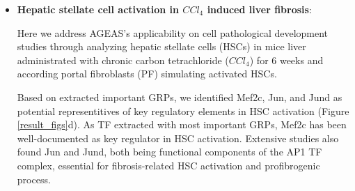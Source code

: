 \documentclass[fleqn,10pt]{wlscirep}
\begin{document}
\begin{itemize}


      \item {\textbf{Hepatic stellate cell activation in $CCl_4$ induced liver fibrosis}}:

        Here we address AGEAS's applicability on cell pathological development studies through analyzing hepatic stellate cells (HSCs) in mice liver administrated with chronic carbon tetrachloride ($CCl_4$) for 6 weeks and according portal fibroblasts (PF) simulating activated HSCs.

        Based on extracted important GRPs, we identified Mef2c, Jun, and Jund as potential representitives of key regulatory elements in HSC activation (Figure \ref{result_figs}d).
        As TF extracted with most important GRPs, Mef2c has been well-documented as key regulator in HSC activation. \cite{mef2c_1, mef2c_2, mef2c_3}
        Extensive studies also found Jun and Jund, both being functional components of the AP1 TF complex, essential for fibrosis-related HSC activation and profibrogenic process. \cite{ap1_hsc_1, ap1_hsc_2, ap1_hsc_3, ap1_hsc_4}


\end{itemize}
\end{document}

